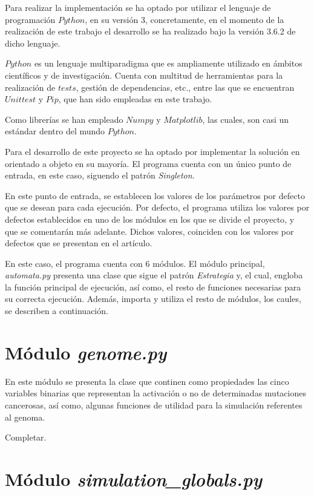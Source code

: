 Para realizar la implementación se ha optado por utilizar el lenguaje de programación $Python$, en
su versión 3, concretamente, en el momento de la realización de este trabajo el desarrollo se ha realizado
bajo la versión 3.6.2 de dicho lenguaje.

$Python$ es un lenguaje multiparadigma que es ampliamente utilizado en ámbitos científicos y de investigación.
Cuenta con multitud de herramientas para la realización de $tests$, gestión de dependencias, etc., entre las
que se encuentran $Unittest$ y $Pip$, que han sido empleadas en este trabajo.

Como librerías se han empleado $Numpy$ y $Matplotlib$, las cuales, son casi un estándar dentro
del mundo $Python$.

Para el desarrollo de este proyecto se ha optado por implementar la solución en orientado a objeto
en su mayoría. El programa cuenta con un único punto de entrada, en este caso, siguendo el patrón
\textit{Singleton}.

En este punto de entrada, se establecen los valores de los parámetros por defecto que se desean
para cada ejecución. Por defecto, el programa utiliza los valores por defectos establecidos en
uno de los módulos en los que se divide el proyecto, y que se comentarán más adelante. Dichos valores,
coinciden con los valores por defectos que se presentan en el artículo.

En este caso, el programa cuenta con 6 módulos. El módulo principal, \textit{automata.py} presenta
una clase que sigue el patrón \textit{Estrategia} y, el cual, engloba la función principal de ejecución,
así como, el resto de funciones necesarias para su correcta ejecución. Además, importa y utiliza
el resto de módulos, los caules, se describen a continuación.

\section{Módulo \textit{genome.py}}

En este módulo se presenta la clase que continen como propiedades las cinco variables
binarias que representan la activación o no de determinadas mutaciones cancerosas, así como,
algunas funciones de utilidad para la simulación referentes al genoma.

Completar.

\section{Módulo \textit{simulation\_globals.py}}

